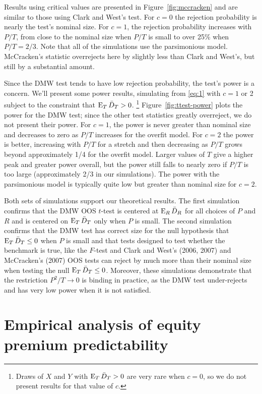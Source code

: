 \documentclass[12pt]{article}
\begin{document}
Results using  critical values are
presented in Figure~\ref{fig:mccracken} and are similar to those using
Clark and West's test.  For $c=0$ the rejection probability is nearly
the test's nominal size.  For $c=1$, the rejection probability
increases with $P/T$, from close to the nominal size when $P/T$ is
small to over 25\% when $P/T = 2/3$.  Note that all of the simulations
use the parsimonious model.  McCracken's statistic overrejects here
by slightly less than Clark and West's, but still by a substantial
amount.

Since the DMW test tends to have low rejection probability, the
test's power is a concern.  We'll present some power results,
simulating from \eqref{eq:1} with $c = 1$ or 2 subject to the
constraint that $\operatorname{E}_T \bar{D}_{T} > 0$.%
\footnote{Draws of $X$ and $Y$ with
  $\operatorname{E}_T \bar{D}_{T} > 0$ are very rare when $c=0$, so we do not present
  results for that value of $c$.} %
Figure~\ref{fig:ttest-power} plots
the power for the DMW test; since the other test statistics greatly
overreject, we do not present their power.  For $c=1$, the power is
never greater than nominal size and decreases to zero as $P/T$
increases for the overfit model.  For $c=2$ the power is better,
increasing with $P/T$ for a stretch and then decreasing as $P/T$ grows
beyond approximately 1/4 for the overfit model.  Larger values of $T$
give a higher peak and greater power overall, but the power still
falls to nearly zero if $P/T$ is too large (approximately 2/3 in our
simulations).  The power with the parsimonious model is typically
quite low but greater than nominal size for $c = 2$.

Both sets of simulations support our theoretical results.  The first
simulation confirms that the DMW OOS $t$-test is centered at $\operatorname{E}_R
\bar{D}_{R}$ for all choices of $P$ and $R$ and is centered on $\operatorname{E}_T \bar{D}_{T}$
only when $P$ is small.  The second simulation confirms that the DMW
test has correct size for the null hypothesis that $\operatorname{E}_T \bar{D}_{T} \leq 0$
when $P$ is small and that tests designed to test whether the
benchmark is true, like the $F$-test and Clark and West's (2006, 2007)
and McCracken's (2007) OOS tests can reject by much more than their
nominal size when testing the null $\operatorname{E}_T \bar{D}_{T} \leq 0$.  Moreover,
these simulations demonstrate that the restriction $P^2/T \to 0$ is
binding in practice, as the DMW test under-rejects and has very low
power when it is not satisfied.

\section{Empirical analysis of equity premium predictability}
\label{sec:empirics}
\end{document}
